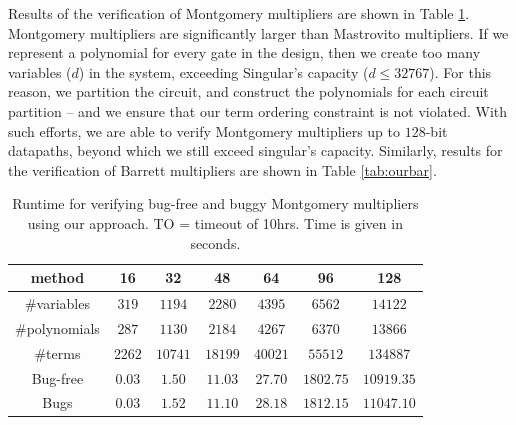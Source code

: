 Results of the verification of Montgomery multipliers are
shown in Table \ref{tab:mmexp}. Montgomery multipliers are
significantly larger than Mastrovito multipliers. If we represent a
polynomial for every gate in the design, then we create too many
variables ($d$) in the system, exceeding {\sc Singular's} capacity
($d\leq 32767$). For this reason, we partition the circuit,
and construct the polynomials for each circuit partition -- and we
ensure that our term ordering constraint is not violated.
With such efforts, we are able to verify Montgomery multipliers up to
$128$-bit datapaths, beyond which we still exceed {\sc singular's}
capacity.  Similarly, results for the verification of Barrett
multipliers are shown in Table \ref{tab:ourbar}.



\begin{table}[b]
\begin{center}
\caption{ Runtime for verifying bug-free and buggy Montgomery
  multipliers using our approach. TO = timeout of 10hrs. Time is given
  in seconds.} 
\label{tab:mmexp}
\begin{tabular}{|c||c|c|c|c|c|c|} \hline 
method & 16 & 32 & 48 & 64 & 96 & 128  \\
\hline
\#variables &$319$ &$1194$ &$2280$ &$4395$ &$6562$ &$14122$  \\
\hline
\#polynomials &$287$ &$1130$ &$2184$ &$4267$ &$6370$ &$13866$  \\
\hline
\#terms &$2262$ &$10741$ &$18199$ &$40021$ &$55512$ &$134887$  \\
\hline
Bug-free &$0.03$ &$1.50$ &$11.03$ &$27.70$ &$1802.75$ &$10919.35$  \\
\hline
Bugs & $0.03$ &$1.52$ & $11.10$ &$28.18$ &$1812.15$ &$11047.10$ \\
\hline
\end{tabular}
\end{center}
\end{table}

